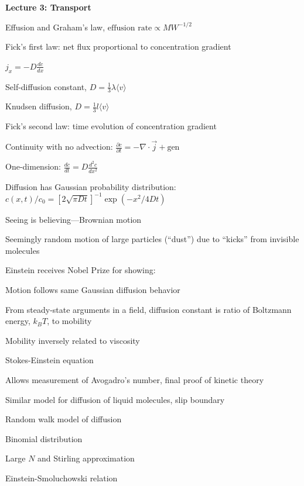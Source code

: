 \documentclass[11pt]{article}
\begin{document}
\begin{outline}
\item{{\bf Lecture 3: Transport}}
  \begin{outline}
  \item{Effusion and Graham's law, $\text{effusion rate}\propto MW^{-1/2}$}
  \item{Fick's first law: net flux proportional to concentration gradient}
    \begin{outline}
    \item{$j_x = -D \frac{d c}{d x}$}
      \item{Self-diffusion constant, $D=\frac{1}{3}\lambda \langle v \rangle$}
    \end{outline}
  \item Knudsen diffusion, $D=\frac{1}{3}l \langle v \rangle$
  \item{Fick's second law: time evolution of concentration gradient}
    \begin{outline}
      \item{Continuity with no advection: $\frac{\partial c}{\partial t}
          = -\nabla\cdot \vec{j} + \text{gen}  $}
      \item{One-dimension: $\frac{d c}{d t} = D \frac{d^2 c}{dx^2}$}
      \item{Diffusion has Gaussian probability distribution: $c(x,t)/c_0 = [2 \sqrt{\pi D
          t}]^{-1} \exp(-x^2/4Dt)$}
    \end{outline}

  \item{Seeing is believing---Brownian motion}
    \begin{outline}
    \item{Seemingly random motion of large particles (``dust'') due to ``kicks'' from invisible molecules}
    \item{Einstein receives Nobel Prize for showing:}
      \begin{outline}
      \item{Motion follows same Gaussian diffusion behavior}
      \item{From steady-state arguments in a field, diffusion constant
          is ratio of Boltzmann energy,
          $k_B T$, to mobility }
      \item{Mobility inversely related to viscosity}
        \end{outline}
        \item{Stokes-Einstein equation}
        \item{Allows measurement of Avogadro's number, final proof of
            kinetic theory}
        \item{Similar model for diffusion of liquid molecules, slip boundary}
    \end{outline}
  \item{Random walk model of diffusion}
    \begin{outline}
    \item{Binomial distribution}
    \item{Large $N$ and Stirling approximation}
    \item{Einstein-Smoluchowski relation}
    \end{outline}
  \end{outline}


\end{outline}
\end{document}
